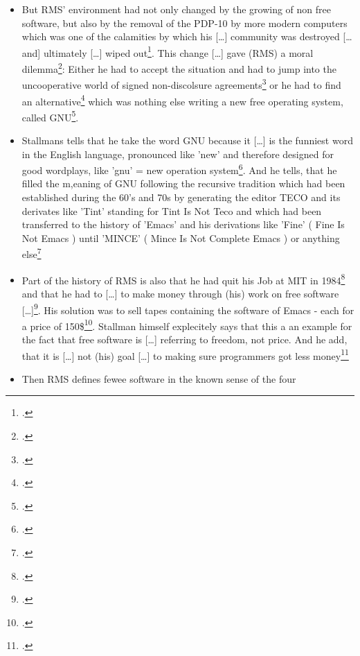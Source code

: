 \documentclass[DIV=calc,BCOR=5mm,11pt,headings=small,oneside,abstract=true, toc=bib]{scrartcl}
\begin{document}
\begin{itemize}
  had to sign a non-disclosure agreement\footcite[cf][159]{Stallman2001a}
  \item But RMS' environment had not only changed by the growing of non free
  software, but also by the removal of the PDP-10 by more modern computers which
  was one of the \glqq{}calamities\grqq{} by which his \glqq{}[\ldots]
  community was destroyed [\ldots and] ultimately [\ldots] wiped
  out\grqq{}\footcite[cf][157 (richtige Seite!)]{Stallman2001a}. This change
  \glqq{}[\ldots] gave (RMS) a moral dilemma\grqq{}\footcite[cf][159 (richtige
  Seite!)]{Stallman2001a}: Either he had to accept the situation and had to jump
  into the uncooperative world of signed \glqq{}non-discolsure
  agreements\grqq{}\footcite[cf][159]{Stallman2001a} or he had to find an
  \glqq{}alternative\grqq{}\footcite[cf][160]{Stallman2001a} which was nothing
  else writing a new free operating system, called
  GNU\footcite[cf][161]{Stallman2001a}.
  \item Stallmans tells that he take the word GNU because it \glqq{}[\ldots]
  is the funniest word in the English language\grqq{}, pronounced like 'new' and
  therefore designed for good wordplays, like 'gnu' = new operation
  system\footcite[cf][161]{Stallman2001a}. And he tells, that he filled the
  m,eaning of GNU following the recursive tradition which had been established
  during the 60's and 70s by generating the editor TECO and its derivates like
  'Tint' standing for \glqq{}Tint Is Not Teco\grqq{} and which had been
  transferred to the history of 'Emacs' and his derivations like 'Fine' (
  \glqq{}Fine Is Not Emacs\grqq{} ) until 'MINCE' ( \glqq{}Mince Is Not
  Complete Emacs\grqq{} ) or anything else\footcite[cf][161]{Stallman2001a}
  \item Part of the history of RMS is also that he had quit his Job at MIT in
  1984\footcite[cf][162]{Stallman2001a} and that he had to \glqq{}[\ldots]
  to make money through (his) work on free software
  [\ldots]\grqq{}\footcite[cf][162]{Stallman2001a}. His solution was to sell
  \glqq{}tapes\grqq{} containing the software of \glqq{}Emacs\grqq{} - each for
  a price of 150\$\footcite[cf][162]{Stallman2001a}. Stallman himself
  explecitely says that this a an example for the fact that \glqq{}free
  software\grqq{} is \glqq{}[\ldots] referring to freedom, not price\grqq{}. And
  he add, that it is \glqq{}[\ldots] not (his) goal [\ldots] to making
  sure programmers got less money\grqq{}\footcite[cf][163]{Stallman2001a}
  \item Then RMS defines fewee software in the known sense of the four

\end{itemize}
\end{document}
